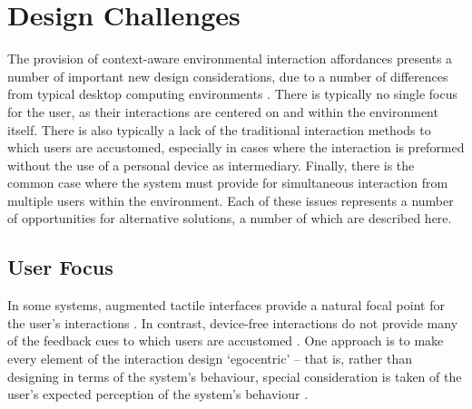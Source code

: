 \documentclass[oribibl,11pt]{llncs}
\begin{document}
\section{Design Challenges}		\label{sec:design_challenges}
The provision of context-aware environmental interaction affordances presents a number of important new design considerations, due to a number of differences from typical desktop computing environments \cite{Shafer:2001:IIC:1463108.1463124}. There is typically no single focus for the user, as their interactions are centered on and within the environment itself. There is also typically a lack of the traditional interaction methods to which users are accustomed, especially in cases where the interaction is preformed without the use of a personal device as intermediary. Finally, there is the common case where the system must provide for simultaneous interaction from multiple users within the environment. Each of these issues represents a number of opportunities for alternative solutions, a number of which are described here.






\subsection{User Focus}		\label{sub:user_focus}
In some systems, augmented tactile interfaces provide a natural focal point for the user's interactions \cite{Schmidt:2002:UIU:1765426.1765451}. In contrast, device-free interactions do not provide many of the feedback cues to which users are accustomed \cite{Heidrich:2013:DIS:2459236.2459248}. One approach is to make every element of the interaction design `egocentric' -- that is, rather than designing in terms of the system's behaviour, special consideration is taken of the user's expected perception of the system's behaviour \cite{Surie:2012:SHE:2469451.2469943}.
\end{document}
